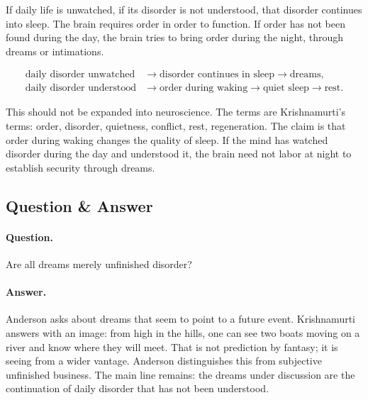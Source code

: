 If daily life is unwatched, if its disorder is not understood, that disorder continues into sleep. The brain requires order in order to function. If order has not been found during the day, the brain tries to bring order during the night, through dreams or intimations.

\begin{align}
\text{daily disorder unwatched}
&\longrightarrow
\text{disorder continues in sleep}
\longrightarrow
\text{dreams},\\
\text{daily disorder understood}
&\longrightarrow
\text{order during waking}
\longrightarrow
\text{quiet sleep}
\longrightarrow
\text{rest}.
\end{align}

This should not be expanded into neuroscience. The terms are Krishnamurti's terms: order, disorder, quietness, conflict, rest, regeneration. The claim is that order during waking changes the quality of sleep. If the mind has watched disorder during the day and understood it, the brain need not labor at night to establish security through dreams.

\subsection{Question \& Answer}

\paragraph{Question.}
Are all dreams merely unfinished disorder?

\paragraph{Answer.}
Anderson asks about dreams that seem to point to a future event. Krishnamurti answers with an image: from high in the hills, one can see two boats moving on a river and know where they will meet. That is not prediction by fantasy; it is seeing from a wider vantage. Anderson distinguishes this from subjective unfinished business. The main line remains: the dreams under discussion are the continuation of daily disorder that has not been understood.


